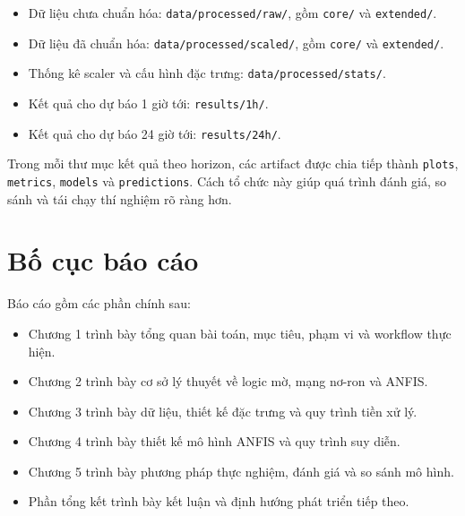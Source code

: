 \begin{itemize}[leftmargin=1.2cm]
  \item Dữ liệu chưa chuẩn hóa: \texttt{data/processed/raw/}, gồm \texttt{core/} và \texttt{extended/}.
  \item Dữ liệu đã chuẩn hóa: \texttt{data/processed/scaled/}, gồm \texttt{core/} và \texttt{extended/}.
  \item Thống kê scaler và cấu hình đặc trưng: \texttt{data/processed/stats/}.
  \item Kết quả cho dự báo 1 giờ tới: \texttt{results/1h/}.
  \item Kết quả cho dự báo 24 giờ tới: \texttt{results/24h/}.
\end{itemize}

Trong mỗi thư mục kết quả theo horizon, các artifact được chia tiếp thành \texttt{plots}, \texttt{metrics}, \texttt{models} và \texttt{predictions}. Cách tổ chức này giúp quá trình đánh giá, so sánh và tái chạy thí nghiệm rõ ràng hơn.

\section{Bố cục báo cáo}

Báo cáo gồm các phần chính sau:

\begin{itemize}[leftmargin=1.2cm]
  \item Chương 1 trình bày tổng quan bài toán, mục tiêu, phạm vi và workflow thực hiện.
  \item Chương 2 trình bày cơ sở lý thuyết về logic mờ, mạng nơ-ron và ANFIS.
  \item Chương 3 trình bày dữ liệu, thiết kế đặc trưng và quy trình tiền xử lý.
  \item Chương 4 trình bày thiết kế mô hình ANFIS và quy trình suy diễn.
  \item Chương 5 trình bày phương pháp thực nghiệm, đánh giá và so sánh mô hình.
  \item Phần tổng kết trình bày kết luận và định hướng phát triển tiếp theo.
\end{itemize}
